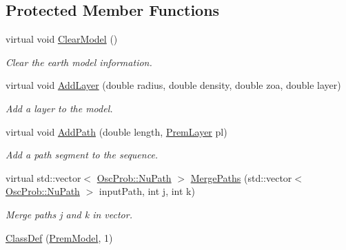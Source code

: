 \subsection*{Protected Member Functions}
\begin{DoxyCompactItemize}
\item 
virtual void \hyperlink{classOscProb_1_1PremModel_aaead53a9385bda9b0219fd051d0cdd11}{Clear\+Model} ()
\begin{DoxyCompactList}\small\item\em Clear the earth model information. \end{DoxyCompactList}\item 
virtual void \hyperlink{classOscProb_1_1PremModel_a08c337b84138adc46ee4dd002e9262d2}{Add\+Layer} (double radius, double density, double zoa, double layer)
\begin{DoxyCompactList}\small\item\em Add a layer to the model. \end{DoxyCompactList}\item 
virtual void \hyperlink{classOscProb_1_1PremModel_aca013f7ac5494282834048786a0e07a6}{Add\+Path} (double length, \hyperlink{structOscProb_1_1PremLayer}{Prem\+Layer} pl)
\begin{DoxyCompactList}\small\item\em Add a path segment to the sequence. \end{DoxyCompactList}\item 
virtual std\+::vector$<$ \hyperlink{structOscProb_1_1NuPath}{Osc\+Prob\+::\+Nu\+Path} $>$ \hyperlink{classOscProb_1_1PremModel_a87cb8043b58fde2c8a8779e6ae1b5135}{Merge\+Paths} (std\+::vector$<$ \hyperlink{structOscProb_1_1NuPath}{Osc\+Prob\+::\+Nu\+Path} $>$ input\+Path, int j, int k)
\begin{DoxyCompactList}\small\item\em Merge paths j and k in vector. \end{DoxyCompactList}\item 
\hyperlink{classOscProb_1_1PremModel_a9a1d78e29217bb0dd00ae3bd96d22b69}{Class\+Def} (\hyperlink{classOscProb_1_1PremModel}{Prem\+Model}, 1)
\end{DoxyCompactItemize}
